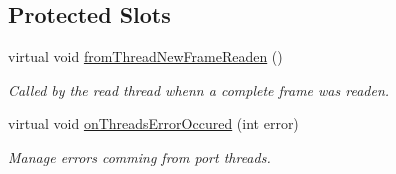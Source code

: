 \subsection*{Protected Slots}
\begin{DoxyCompactItemize}
\item 
virtual void \hyperlink{classmdt_port_manager_a4fcc8f0699b655156e661bb3de6056cc}{fromThreadNewFrameReaden} ()
\begin{DoxyCompactList}\small\item\em Called by the read thread whenn a complete frame was readen. \end{DoxyCompactList}\item 
virtual void \hyperlink{classmdt_port_manager_a7e45b8e3475e5182ed12218616664d07}{onThreadsErrorOccured} (int error)
\begin{DoxyCompactList}\small\item\em Manage errors comming from port threads. \end{DoxyCompactList}\end{DoxyCompactItemize}
